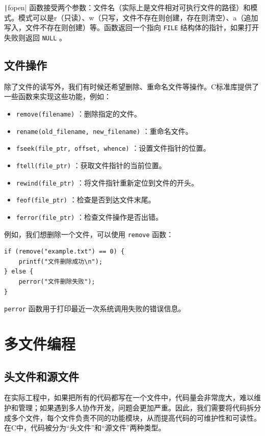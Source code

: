 \texttt|fopen| 函数接受两个参数：文件名（实际上是文件相对可执行文件的路径）和模式。模式可以是r（只读）、w（只写，文件不存在则创建，存在则清空）、a（追加写入，文件不存在则创建）等。函数返回一个指向 \texttt{FILE} 结构体的指针，如果打开失败则返回 \texttt{NULL} 。

\subsection{文件操作}

除了文件的读写外，我们有时候还希望删除、重命名文件等操作。C标准库提供了一些函数来实现这些功能，例如：
\begin{itemize}
  \item \texttt{remove(filename)} ：删除指定的文件。
  \item \texttt{rename(old\_filename, new\_filename)} ：重命名文件。
  \item \texttt{fseek(file\_ptr, offset, whence)} ：设置文件指针的位置。
  \item \texttt{ftell(file\_ptr)} ：获取文件指针的当前位置。
  \item \texttt{rewind(file\_ptr)} ：将文件指针重新定位到文件的开头。
  \item \texttt{feof(file\_ptr)} ：检查是否到达文件末尾。
  \item \texttt{ferror(file\_ptr)} ：检查文件操作是否出错。
\end{itemize}
例如，我们想删除一个文件，可以使用 \texttt{remove} 函数：
\begin{verbatim}
if (remove("example.txt") == 0) {
    printf("文件删除成功\n");
} else {
    perror("文件删除失败");
}
\end{verbatim}
\verb|perror| 函数用于打印最近一次系统调用失败的错误信息。

\section{多文件编程}

\subsection{头文件和源文件}

在实际工程中，如果把所有的代码都写在一个文件中，代码量会非常庞大，难以维护和管理；如果遇到多人协作开发，问题会更加严重。因此，我们需要将代码拆分成多个文件，每个文件负责不同的功能模块，从而提高代码的可维护性和可读性。在C中，代码被分为“头文件”和“源文件”两种类型。

